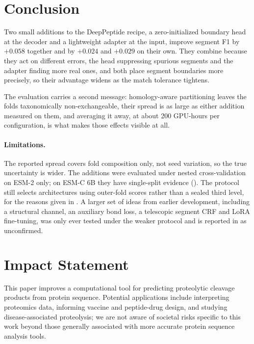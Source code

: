 \documentclass{article}
\begin{document}
\section{Conclusion}
\label{sec:conclusion}

Two small additions to the DeepPeptide recipe, a zero-initialized boundary head at the decoder and a lightweight adapter at the input, improve segment F1 by $+0.058$ together and by $+0.024$ and $+0.029$ on their own. They combine because they act on different errors, the head suppressing spurious segments and the adapter finding more real ones, and both place segment boundaries more precisely, so their advantage widens as the match tolerance tightens.

The evaluation carries a second message: homology-aware partitioning leaves the folds taxonomically non-exchangeable, their spread is as large as either addition measured on them, and averaging it away, at about 200 GPU-hours per configuration, is what makes those effects visible at all.

\paragraph{Limitations.} The reported spread covers fold composition only, not seed variation, so the true uncertainty is wider. The additions were evaluated under nested cross-validation on ESM-2 only; on ESM-C 6B they have single-split evidence (). The protocol still selects architectures using outer-fold scores rather than a sealed third level, for the reasons given in . A larger set of ideas from earlier development, including a structural channel, an auxiliary bond loss, a telescopic segment CRF and LoRA fine-tuning, was only ever tested under the weaker protocol and is reported in  as unconfirmed.




\section*{Impact Statement}
This paper improves a computational tool for predicting proteolytic cleavage products from protein sequence. Potential applications include interpreting proteomics data, informing vaccine and peptide-drug design, and studying disease-associated proteolysis; we are not aware of societal risks specific to this work beyond those generally associated with more accurate protein sequence analysis tools.
\newpage
\appendix
\end{document}
